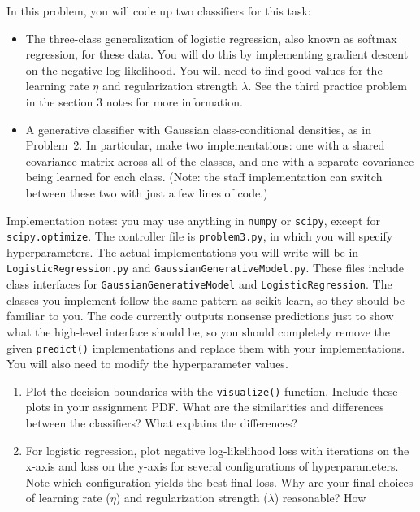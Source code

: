 \documentclass[submit]{harvardml}
\begin{document}
\begin{problem}
In this problem, you will code up two classifiers for this task:
\begin{itemize}
\item The three-class generalization of logistic regression, also
  known as softmax regression, for these data. You will do this by
  implementing gradient descent on the negative log likelihood. You
  will need to find good values for the learning rate $\eta$ and
  regularization strength $\lambda$. See the third practice problem in
  the section 3 notes for more information.
\item A generative classifier with Gaussian class-conditional
  densities, as in Problem~2. In particular, make two implementations:
  one with a shared covariance matrix across all of the classes, and
  one with a separate covariance being learned for each class.  (Note:
  the staff implementation can switch between these two with just a
  few lines of code.)
\end{itemize}
Implementation notes: you may use anything in \texttt{numpy} or
\texttt{scipy}, except for \texttt{scipy.optimize}.  The controller
file is \texttt{problem3.py}, in which you will specify
hyperparameters. The actual implementations you will write will be in
\texttt{LogisticRegression.py} and
\texttt{GaussianGenerativeModel.py}.  These files include class
interfaces for \texttt{GaussianGenerativeModel} and
\texttt{LogisticRegression}. The classes you implement follow the same pattern
as scikit-learn, so they should be familiar to you.  The code
currently outputs nonsense predictions just to show what the
high-level interface should be, so you should completely remove the
given \texttt{predict()} implementations and replace them with your
implementations.  You will also need to modify the hyperparameter
values.
\begin{enumerate}
\item Plot the decision boundaries with the \texttt{visualize()}
  function. Include these plots in your assignment PDF. What are the similarities and differences between the
  classifiers?  What explains the differences?
\item For logistic regression, plot negative log-likelihood loss with
  iterations on the x-axis and loss on the y-axis for several
  configurations of hyperparameters. Note which configuration yields
  the best final loss. Why are your final choices of learning rate
  ($\eta$) and regularization strength ($\lambda$) reasonable? How

\end{enumerate}
\end{problem}
\end{document}
